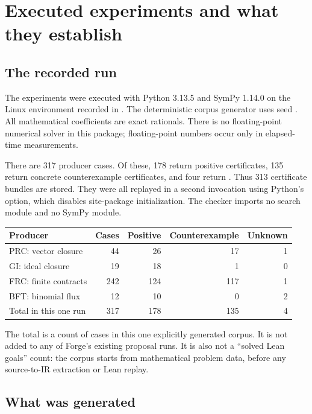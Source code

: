 \section{Executed experiments and what they establish}
\label{sec:evidence}

\subsection{The recorded run}

The experiments were executed with Python 3.13.5 and SymPy 1.14.0 on the Linux environment recorded in . The deterministic corpus generator uses seed . All mathematical coefficients are exact rationals. There is no floating-point numerical solver in this package; floating-point numbers occur only in elapsed-time measurements.

There are 317 producer cases. Of these, 178 return positive certificates, 135 return concrete counterexample certificates, and four return \unknown{}. Thus 313 certificate bundles are stored. They were all replayed in a second invocation using Python's  option, which disables site-package initialization. The checker imports no search module and no SymPy module.

\begin{center}
\begin{tabular}{@{}lrrrr@{}}
\toprule
Producer & Cases & Positive & Counterexample & Unknown\\
\midrule
PRC: vector closure & 44 & 26 & 17 & 1\\
GI: ideal closure & 19 & 18 & 1 & 0\\
FRC: finite contracts & 242 & 124 & 117 & 1\\
BFT: binomial flux & 12 & 10 & 0 & 2\\
\midrule
Total in this one run & 317 & 178 & 135 & 4\\
\bottomrule
\end{tabular}
\end{center}

The total is a count of cases in this one explicitly generated corpus. It is not added to any of Forge's existing proposal runs. It is also not a ``solved Lean goals'' count: the corpus starts from mathematical problem data, before any source-to-IR extraction or Lean replay.

\subsection{What was generated}

